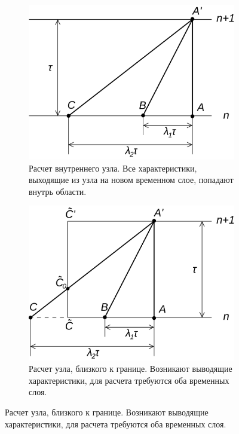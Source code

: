 \begin{figure}[ht]
\centering
\begin{subfigure}[b]{0.45\textwidth}
\centering
\includegraphics[width=\textwidth]{png/characteristics-2d-triangles-inner-1.png}
\caption{Расчет внутреннего узла. Все характеристики, выходящие из узла на новом временном слое, попадают внутрь области.}
\end{subfigure}
\begin{subfigure}[b]{0.45\textwidth}
\centering
\includegraphics[width=\textwidth]{png/characteristics-2d-triangles-semi-border-1.png}
\caption{Расчет узла, близкого к границе. Возникают выводящие характеристики, для расчета требуются оба временных слоя.}
\end{subfigure}

\end{figure}
